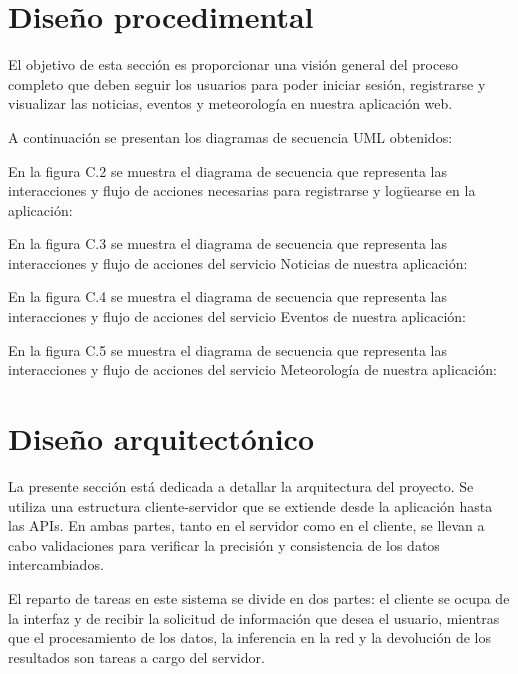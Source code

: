 \section{Diseño procedimental}

El objetivo de esta sección es proporcionar una visión general del proceso completo que deben seguir los usuarios para poder iniciar sesión, registrarse y  visualizar las noticias, eventos y meteorología en nuestra aplicación web. 

A continuación se presentan los diagramas de secuencia UML \cite{UML} obtenidos:

En la figura C.2 se muestra el diagrama de secuencia que representa las interacciones y flujo de acciones necesarias para registrarse y logüearse en la aplicación:


En la figura C.3 se muestra el diagrama de secuencia que representa las interacciones y flujo de acciones del servicio Noticias de nuestra aplicación:


En la figura C.4 se muestra el diagrama de secuencia que representa las interacciones y flujo de acciones del servicio Eventos de nuestra aplicación:


En la figura C.5 se muestra el diagrama de secuencia que representa las interacciones y flujo de acciones del servicio Meteorología de nuestra aplicación:



\section{Diseño arquitectónico}

La presente sección está dedicada a detallar la arquitectura del proyecto. Se utiliza una estructura cliente-servidor que se extiende desde la aplicación hasta las APIs. En ambas partes, tanto en el servidor como en el cliente, se llevan a cabo validaciones para verificar la precisión y consistencia de los datos intercambiados.

El reparto de tareas en este sistema se divide en dos partes: el cliente se ocupa de la interfaz y de recibir la solicitud de información que desea el usuario, mientras que el procesamiento de los datos, la inferencia en la red y la devolución de los resultados son tareas a cargo del servidor.

